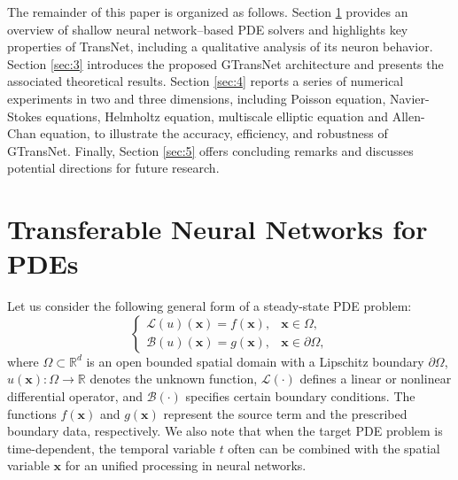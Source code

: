 \documentclass{article}
\newcommand{\bx}{\mathbf{x}}
\begin{document}

The remainder of this paper is organized as follows. Section \ref{sec:2} provides an overview of shallow neural network–based PDE solvers and highlights key properties of TransNet, including a qualitative analysis of its neuron behavior. Section \ref{sec:3} introduces the proposed GTransNet architecture and presents the associated theoretical results. Section \ref{sec:4} reports a series of numerical experiments in two and three dimensions, including Poisson equation, 
Navier-Stokes equations, Helmholtz equation, multiscale elliptic equation and Allen-Chan equation,  to illustrate the accuracy, efficiency, and robustness of GTransNet. Finally, Section \ref{sec:5} offers concluding remarks and discusses potential directions for future research.

\section{Transferable Neural Networks for PDEs}\label{sec:2}

Let us consider the following general form of a steady-state PDE problem:
\begin{equation}\label{modelp}
\begin{cases}
\mathcal{L}(u)(\bx) = f(\bx), & \bx \in \Omega, \\
\mathcal{B}(u)(\bx) = g(\bx), & \bx \in \partial\Omega,
\end{cases}
\end{equation}
where $\Omega \subset \mathbb{R}^d$ is an open bounded spatial domain with a Lipschitz boundary \(\partial \Omega\),
$u(\bx):\Omega\rightarrow\mathbb{R}$ denotes the unknown function,
\(\mathcal{L}(\cdot)\) defines a linear or nonlinear differential operator, and \(\mathcal{B}(\cdot)\) specifies 
certain boundary conditions. The functions  \(f(\bx)\) and \(g(\bx)\) represent the source term and the prescribed boundary data, respectively. We also note that when the target PDE problem is time-dependent, the temporal variable $t$ often can be combined with the spatial variable $\bx$ for an unified processing in neural networks.
\end{document}
